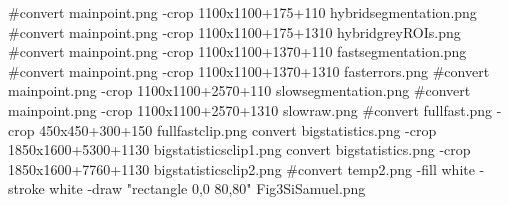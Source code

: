 #convert mainpoint.png -crop 1100x1100+175+110 hybridsegmentation.png
#convert mainpoint.png -crop 1100x1100+175+1310 hybridgreyROIs.png
#convert mainpoint.png -crop 1100x1100+1370+110 fastsegmentation.png
#convert mainpoint.png -crop 1100x1100+1370+1310 fasterrors.png
#convert mainpoint.png -crop 1100x1100+2570+110 slowsegmentation.png
#convert mainpoint.png -crop 1100x1100+2570+1310 slowraw.png
#convert fullfast.png -crop 450x450+300+150 fullfastclip.png
convert bigstatistics.png -crop 1850x1600+5300+1130 bigstatisticsclip1.png
convert bigstatistics.png -crop 1850x1600+7760+1130 bigstatisticsclip2.png
#convert temp2.png -fill white -stroke white -draw "rectangle 0,0 80,80" Fig3SiSamuel.png

